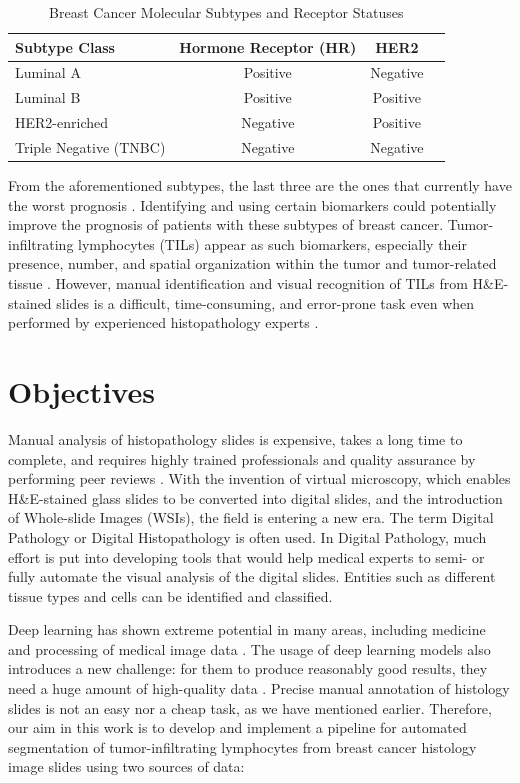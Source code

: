 \begin{table}[H]
 \centering
 \caption{Breast Cancer Molecular Subtypes and Receptor Statuses}
 \label{tab:breast_cancer_subtypes}
 \begin{tabular}{|l|c|c|c|}
 \hline
 \textbf{Subtype Class} & \textbf{Hormone Receptor (HR)} & \textbf{HER2} \\
 \hline
 Luminal A & Positive & Negative \\
 \hline
 Luminal B & Positive & Positive \\
 \hline
 HER2-enriched & Negative & Positive \\
 \hline
 Triple Negative (TNBC) & Negative & Negative \\
 \hline
 \end{tabular}
\end{table}

From the aforementioned subtypes, the last three are the ones that currently have the worst prognosis \cite{Schalper2022, Zhang2024}. Identifying and using certain biomarkers could potentially improve the prognosis of patients with these subtypes of breast cancer. Tumor-infiltrating lymphocytes (TILs) appear as such biomarkers, especially their presence, number, and spatial organization within the tumor and tumor-related tissue \cite{Salgado2015, Denkert2018, Amgad2019}. However, manual identification and visual recognition of TILs from H\&E-stained slides is a difficult, time-consuming, and error-prone task even when performed by experienced histopathology experts \cite{Salgado2015, Amgad2019}.

\section{Objectives}
Manual analysis of histopathology slides is expensive, takes a long time to complete, and requires highly trained professionals and quality assurance by performing peer reviews \cite{Wemmert2021}. With the invention of virtual microscopy, which enables H\&E-stained glass slides to be converted into digital slides, and the introduction of Whole-slide Images (WSIs), the field is entering a new era. The term Digital Pathology or Digital Histopathology is often used. In Digital Pathology, much effort is put into developing tools that would help medical experts to semi- or fully automate the visual analysis of the digital slides. Entities such as different tissue types and cells can be identified and classified.

Deep learning has shown extreme potential in many areas, including medicine and processing of medical image data \cite{LeCun2015}. The usage of deep learning models also introduces a new challenge: for them to produce reasonably good results, they need a huge amount of high-quality data \cite{Santosh2022-3}. Precise manual annotation of histology slides is not an easy nor a cheap task, as we have mentioned earlier. Therefore, our aim in this work is to develop and implement a pipeline for automated segmentation of tumor-infiltrating lymphocytes from breast cancer histology image slides using two sources of data:

